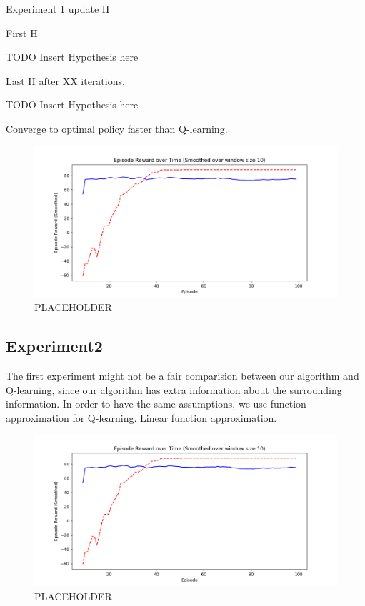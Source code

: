 Experiment 1 update H

First H

TODO Insert Hypothesis here

Last H after XX iterations. 

TODO Insert Hypothesis here


Converge to optimal policy faster than Q-learning.

\begin{figure}[!htb]
\centering
\includegraphics[width=1.0\textwidth]{./figures/placeholder}
\caption{PLACEHOLDER}
\label{proposed_architecture}
\end{figure}
    


\subsection{Experiment2}

The first experiment might not be a fair comparision between our algorithm and Q-learning, since our algorithm has extra information about the surrounding information.
In order to have the same assumptions, we use function approximation for Q-learning. 
Linear function approximation. 

\begin{figure}[!htb]
\centering
\includegraphics[width=1.0\textwidth]{./figures/placeholder}
\caption{PLACEHOLDER}
\label{proposed_architecture}
\end{figure}
    

